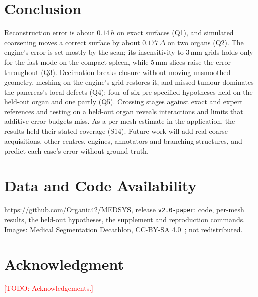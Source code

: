 \documentclass[conference]{IEEEtran}
\newcommand{\todo}[1]{\textcolor{red}{[TODO: #1]}}
\newcommand{\mm}{\,mm\xspace}
\begin{document}
\section{Conclusion}
Reconstruction error is about $0.14\,h$ on exact surfaces (Q1), and simulated coarsening moves a correct surface by about $0.177\,\Delta$ on two organs (Q2). The engine's error is set mostly by the scan; its insensitivity to 3\mm grids holds only for the fast mode on the compact spleen, while 5\mm slices raise the error throughout (Q3). Decimation breaks closure without moving unsmoothed geometry, meshing on the engine's grid restores it, and missed tumour dominates the pancreas's local defects (Q4); four of six pre-specified hypotheses held on the held-out organ and one partly (Q5). Crossing stages against exact and expert references and testing on a held-out organ reveals interactions and limits that additive error budgets miss. As a per-mesh estimate in the application, the results held their stated coverage (S14). Future work will add real coarse acquisitions, other centres, engines, annotators and branching structures, and predict each case's error without ground truth.

\section*{Data and Code Availability}
\url{https://github.com/Organic42/MEDSYS}, release \texttt{v2.0-paper}: code, per-mesh results, the held-out hypotheses, the supplement and reproduction commands. Images: Medical Segmentation Decathlon, CC-BY-SA 4.0~\cite{antonelli2022msd}; not redistributed.

\section*{Acknowledgment}
\todo{Acknowledgements.}



\end{document}
